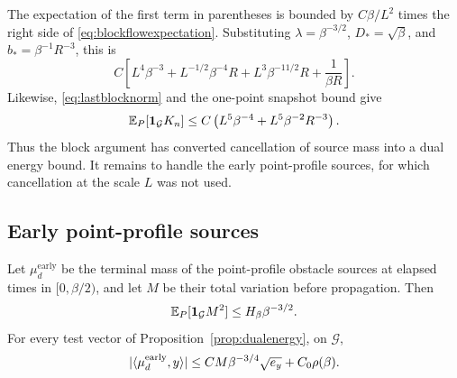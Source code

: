 The expectation of the first term in parentheses is bounded by
\(C\beta/L^2\) times the right side of
\eqref{eq:blockflowexpectation}.  Substituting
\(\lambda=\beta^{-3/2}\), \(D_*=\sqrt\beta\), and
\(b_*=\beta^{-1}R^{-3}\), this is
\begin{equation}\label{eq:smoothdualexpectation}
 C\left[
 L^4\beta^{-3}
 +L^{-1/2}\beta^{-4}R
 +L^3\beta^{-11/2}R
 +\frac1{\beta R}\right].
\end{equation}
Likewise, \eqref{eq:lastblocknorm} and the one-point snapshot bound
give
\begin{equation}\label{eq:copycorrectionexpectation}
 \mathbb E_P[\mathbf 1_{\mathcal G}K_n]
 \le C\left(L^5\beta^{-4}+L^5\beta^{-2}R^{-3}\right).
\end{equation}
Thus the block argument has converted cancellation of source mass
into a dual energy bound.  It remains to handle the early
point-profile sources, for which cancellation at the scale \(L\)
was not used.

\subsection{Early point-profile sources}

\begin{lemma}\label{lem:earlysourceenergy}
Let \(\mu_d^{\mathrm{early}}\) be the terminal mass of the
point-profile obstacle sources at elapsed times in \([0,\beta/2)\),
and let \(M\) be their total variation before propagation.  Then
\begin{equation}\label{eq:earlymassmoment}
 \mathbb E_P[\mathbf 1_{\mathcal G}M^2]\le H_\beta\beta^{-3/2}.
\end{equation}
For every test vector of Proposition~\ref{prop:dualenergy}, on
\(\mathcal G\),
\begin{equation}\label{eq:earlydualbound}
 \lvert \langle \mu_d^{\mathrm{early}},y\rangle\rvert
 \le CM\beta^{-3/4}\sqrt{e_y}+C_0\rho(\beta).
\end{equation}
\end{lemma}

